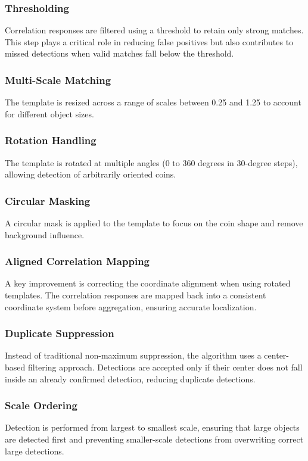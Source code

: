 \documentclass[11pt, letterpaper, twoside]{article}
\begin{document}
\subsubsection{Thresholding}

Correlation responses are filtered using a threshold to retain only strong matches. This step plays a critical role in reducing false positives but also contributes to missed detections when valid matches fall below the threshold.

\subsubsection{Multi-Scale Matching}
The template is resized across a range of scales between 0.25 and 1.25 to account for different object sizes.

\subsubsection{Rotation Handling}
The template is rotated at multiple angles (0 to 360 degrees in 30-degree steps), allowing detection of arbitrarily oriented coins.

\subsubsection{Circular Masking}
A circular mask is applied to the template to focus on the coin shape and remove background influence.

\subsubsection{Aligned Correlation Mapping}
A key improvement is correcting the coordinate alignment when using rotated templates. The correlation responses are mapped back into a consistent coordinate system before aggregation, ensuring accurate localization.

\subsubsection{Duplicate Suppression}
Instead of traditional non-maximum suppression, the algorithm uses a center-based filtering approach. Detections are accepted only if their center does not fall inside an already confirmed detection, reducing duplicate detections.

\subsubsection{Scale Ordering}
Detection is performed from largest to smallest scale, ensuring that large objects are detected first and preventing smaller-scale detections from overwriting correct large detections.
\end{document}
